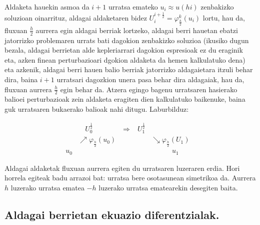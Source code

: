 Aldaketa hauekin asmoa da $i+1$ urratsa emateko $u_i \approx u(hi)$ zenbakizko soluzioan oinarrituz, aldagai aldaketaren bidez $U_i^{i+\frac{1}{2}}=\varphi^k_{\frac{h}{2}}(u_i)$ lortu, hau da, fluxuan $\frac{h}{2}$ aurrera egin aldagai berriak lortzeko, aldagai berri hauetan ebatzi jatorrizko problemaren urrats bati dagokion zenbakizko soluzioa (ikusiko dugun bezala, aldagai berrietan alde kepleriarrari dagokion espresioak ez du eraginik eta, azken finean perturbazioari dgokion aldaketa da hemen kalkulatuko dena) eta azkenik, aldagai berri hauen balio berriak jatorrizko aldagaietara itzuli behar dira, baina $i+1$ urratsari dagozkion unera pasa behar dira aldagaiak, hau da, fluxuan aurrera $\frac{h}{2}$ egin behar da. Atzera egingo bagenu urratsaren hasierako balioei perturbazioak zein aldaketa eragiten dien kalkulatuko baikenuke, baina guk urratsaren bukaerako balioak nahi ditugu. Laburbilduz:


\begin{align*}
   &   \quad U_0^{\frac{1}{2}} \quad \quad \quad \quad \Longrightarrow  & U_1^{\frac{1}{2}}&  &\\
  & \nearrow \varphi_{\frac{h}{2}}(u_0) &            & \searrow \varphi_{\frac{h}{2}}(U_1)& \\
u_0 &                  &    &\quad \quad \quad  u_1
\end{align*}

Aldagai aldaketak fluxuan aurrera egiten du urratsaren luzeraren erdia. Hori horrela egiteak badu arrazoi bat: urratsa bere osotasunean simetrikoa da. Aurrera $h$ luzerako urratsa ematea $-h$ luzerako urratsa ematearekin desegiten baita. 


\subsection*{Aldagai berrietan ekuazio diferentzialak.}

